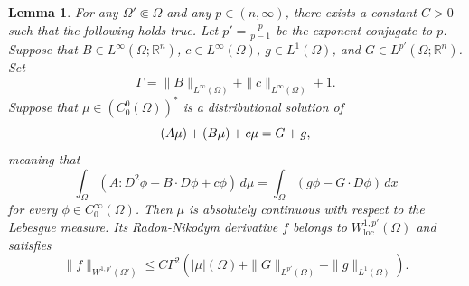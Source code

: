 \documentclass[a4paper]{article}
\newcommand{\R}{\mathbb{R}}
\newcommand{\loc}{\mathrm{loc}}
\let\div\relax\DeclareMathOperator{\div}{div}
\newtheorem{lemma}[theorem]{Lemma}
\theoremstyle{remark}
\begin{document}
\begin{lemma} \label{lem:regularity}
For any $\Omega' \Subset \Omega$ and any $p \in (n, \infty)$, there exists a
constant $C > 0$ such that the following holds true.
Let $p' = \frac{p}{p - 1}$ be the exponent conjugate to $p$.
Suppose that $B \in L^\infty(\Omega; \R^n)$, $c \in L^\infty(\Omega)$, $g \in L^1(\Omega)$,
and $G \in L^{p'}(\Omega; \R^n)$. Set
\[
\Gamma = \|B\|_{L^\infty(\Omega)} + \|c\|_{L^\infty(\Omega)} + 1.
\]
Suppose that $\mu \in (C_0^0(\Omega))^*$ is a distributional solution of
\[
\div \div (A\mu) + \div(B\mu) + c\mu = \div G + g,
\]
meaning that
\begin{equation} \label{eq:div-div-distributional}
\int_\Omega (A : D^2\phi - B \cdot D\phi + c\phi) \, d\mu = \int_\Omega (g\phi - G \cdot D\phi) \, dx
\end{equation}
for every $\phi \in C_0^\infty(\Omega)$. Then $\mu$ is absolutely continuous
with respect to the Lebesgue measure. Its Radon-Nikodym derivative
$f$ belongs to $W_\loc^{1, p'}(\Omega)$ and satisfies
\[
\|f\|_{W^{1, p'}(\Omega')} \le C\Gamma^2 \left(|\mu|(\Omega) + \|G\|_{L^{p'}(\Omega)} + \|g\|_{L^1(\Omega)}\right).
\]
\end{lemma}
\end{document}
